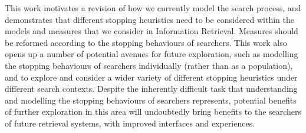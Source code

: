 \begin{preamble}
This work motivates a revision of how we currently model the search process, and demonstrates that different stopping heuristics need to be considered within the models and measures that we consider in Information Retrieval. Measures should be reformed according to the stopping behaviours of searchers. This work also opens up a number of potential avenues for future exploration, such as modelling the stopping behaviours of searchers individually (rather than as a population), and to explore and consider a wider variety of different stopping heuristics under different search contexts. Despite the inherently difficult task that understanding and modelling the stopping behaviours of searchers represents, potential benefits of further exploration in this area will undoubtedly bring benefits to the searchers of future retrieval systems, with improved interfaces and experiences.

\end{preamble}